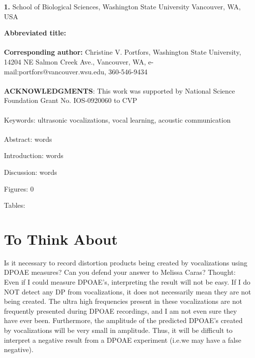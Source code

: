 \documentclass[12pt]{article}
\title{}
\author {Elena J. Mahrt$^{1}$, 
 Patrick D. Roberts $^{1}$, 
 \and Christine V. Portfors$^{1}$}
\date{\small \it (\today)}
\begin{document}
\maketitle

\noindent \textbf{1.} School of Biological Sciences, Washington State University Vancouver, WA, USA


\vspace {3mm}

\noindent \textbf{Abbreviated title:}  {\em }\\ \\
\textbf{Corresponding author:} Christine V. Portfors,  Washington State University, 14204 NE Salmon Creek Ave., Vancouver, WA, e-mail:portfors@vancouver.wsu.edu, 360-546-9434\\ \\
\textbf{ACKNOWLEDGMENTS}: This work was supported by National Science Foundation Grant No. IOS-0920060 to CVP \\ \\
Keywords:  ultrasonic vocalizations, vocal learning, acoustic communication \\\\

Abstract:  words

Introduction:  words

Discussion:  words

Figures: 0

Tables: 
%


\newpage

\begin{abstract}


\end{abstract}
% 

\newpage
\section{To Think About}
Is it necessary to record distortion products being created by vocalizations using DPOAE measures? Can you defend your answer to Melissa Caras?
Thought: Even if I could measure DPOAE's, interpreting the result will not be easy. If I do NOT detect any DP from vocalizations, it does not necessarily mean they are not being created. The ultra high frequencies present in these vocalizations are not frequently presented during DPOAE recordings, and I am not even sure they have ever been. Furthermore, the amplitude of the predicted DPOAE's created by vocalizations will be very small in amplitude. Thus, it will be difficult to interpret a negative result from a DPOAE experiment (i.e.we may have a false negative).
\end{document}
